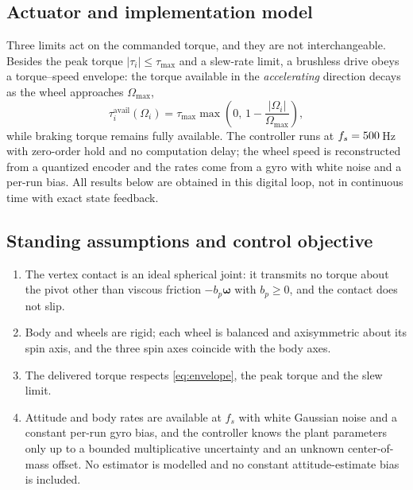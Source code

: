 \documentclass[conference]{IEEEtran}
\theoremstyle{definition}
\theoremstyle{plain}
\newcommand{\bw}{\boldsymbol{\omega}}
\begin{document}
\subsection{Actuator and implementation model}
\label{sec:actuator}

Three limits act on the commanded torque, and they are not interchangeable.
Besides the peak torque $|\tau_i|\le\tau_{\max}$ and a slew-rate limit, a
brushless drive obeys a torque--speed envelope: the torque available in the
\emph{accelerating} direction decays as the wheel approaches $\Omega_{\max}$,
\begin{equation}
\tau_i^{\text{avail}}(\Omega_i) = \tau_{\max}
\max\!\left(0,\,1-\frac{|\Omega_i|}{\Omega_{\max}}\right) ,
\label{eq:envelope}
\end{equation}
while braking torque remains fully available. The controller runs at
$f_s=500{}$\,\si{\hertz} with zero-order hold and no computation delay;
the wheel speed is reconstructed from a quantized encoder and the rates
come from a gyro with white noise and a per-run bias. All results below are
obtained in this digital loop, not in continuous time with exact state
feedback.

\subsection{Standing assumptions and control objective}
\label{sec:assumptions}

\begin{enumerate}[label=(A\arabic*),leftmargin=*]
\item \label{a:pivot} The vertex contact is an ideal spherical joint: it
      transmits no torque about the pivot other than viscous friction
      $-b_p\bw$ with $b_p\ge0$, and the contact does not slip.
\item \label{a:rigid} Body and wheels are rigid; each wheel is balanced and
      axisymmetric about its spin axis, and the three spin axes coincide with
      the body axes.
\item \label{a:act} The delivered torque respects \eqref{eq:envelope}, the
      peak torque and the slew limit.
\item \label{a:meas} Attitude and body rates are available at $f_s$ with
      white Gaussian noise and a constant per-run gyro bias, and the controller knows the plant
      parameters only up to a bounded multiplicative uncertainty and an unknown
      center-of-mass offset. No estimator is modelled and no constant
      attitude-estimate bias is included.
\end{enumerate}
\end{document}

